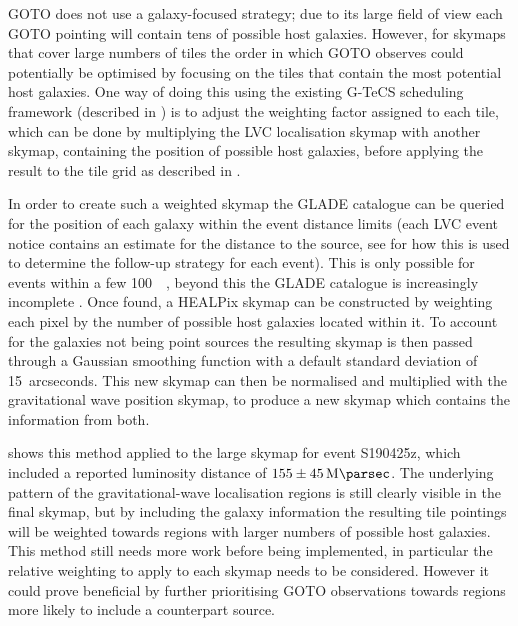 \begin{colsection}
\begin{colsection}
GOTO does not use a galaxy-focused strategy; due to its large field of view each GOTO pointing will contain tens of possible host galaxies. However, for skymaps that cover large numbers of tiles the order in which GOTO observes could potentially be optimised by focusing on the tiles that contain the most potential host galaxies. One way of doing this using the existing G-TeCS scheduling framework (described in ) is to adjust the weighting factor assigned to each tile, which can be done by multiplying the LVC localisation skymap with another skymap, containing the position of possible host galaxies, before applying the result to the tile grid as described in .

In order to create such a weighted skymap the GLADE catalogue can be queried for the position of each galaxy within the event distance limits (each LVC event notice contains an estimate for the distance to the source, see  for how this is used to determine the follow-up strategy for each event). This is only possible for events within a few \SI{100}{\mega\parsec}, beyond this the GLADE catalogue is increasingly incomplete \citep{GLADE}. Once found, a HEALPix skymap can be constructed by weighting each pixel by the number of possible host galaxies located within it. To account for the galaxies not being point sources the resulting skymap is then passed through a Gaussian smoothing function with a default standard deviation of 15~arcseconds. This new skymap can then be normalised and multiplied with the gravitational wave position skymap, to produce a new skymap which contains the information from both.

 shows this method applied to the large skymap for event S190425z, which included a reported luminosity distance of $155\pm\SI{45}{\mega\parsec}$. The underlying pattern of the gravitational-wave localisation regions is still clearly visible in the final skymap, but by including the galaxy information the resulting tile pointings will be weighted towards regions with larger numbers of possible host galaxies. This method still needs more work before being implemented, in particular the relative weighting to apply to each skymap needs to be considered. However it could prove beneficial by further prioritising GOTO observations towards regions more likely to include a counterpart source.


\end{colsection}
\end{colsection}
